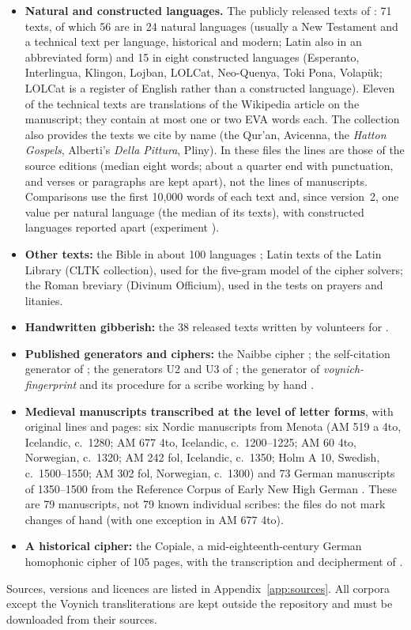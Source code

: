 \begin{itemize}
\item \textbf{Natural and constructed languages.} The publicly released texts of \citet{gaskellbowern2022}: 71 texts,
  of which 56 are in 24 natural languages (usually a New Testament and a technical text per language, historical and
  modern; Latin also in an abbreviated form) and 15 in eight constructed languages (Esperanto, Interlingua, Klingon,
  Lojban, LOLCat, Neo-Quenya, Toki Pona, Volapük; LOLCat is a register of English rather than a constructed language).
  Eleven of the technical texts are translations of the Wikipedia article on the manuscript; they contain at most one
  or two EVA words each. The collection also provides the texts we cite by name (the Qur'an, Avicenna, the \emph{Hatton
  Gospels}, Alberti's \emph{Della Pittura}, Pliny). In these files the lines are those of the source editions (median eight
  words; about a quarter end with punctuation, and verses or paragraphs are kept apart), not the lines of manuscripts. Comparisons use the first 10{,}000 words of each text and, since
  version~2, one value per natural language (the median of its texts), with constructed languages reported apart
  (experiment ).
\item \textbf{Other texts:} the Bible in about 100 languages \citep{christodouloupoulos2015}; Latin texts of the Latin
  Library (CLTK collection), used for the five-gram model of the cipher solvers; the Roman breviary (Divinum Officium),
  used in the tests on prayers and litanies.
\item \textbf{Handwritten gibberish:} the 38 released texts written by volunteers for \citet{gaskellbowern2022}.
\item \textbf{Published generators and ciphers:} the Naibbe cipher \citep{greshko2025}; the self-citation generator of
  \citet{timmschinner2020}; the generators U2 and U3 of \citet{whitehatnetizen2026}; the generator of
  \emph{voynich-fingerprint} and its procedure for a scribe working by hand \citep{sachak2026}.
\item \textbf{Medieval manuscripts transcribed at the level of letter forms}, with original lines and pages: six
  Nordic manuscripts from Menota \citep{menota} (AM 519 a 4to, Icelandic, c.~1280; AM 677 4to, Icelandic, c.~1200--1225;
  AM 60 4to, Norwegian, c.~1320; AM 242 fol, Icelandic, c.~1350; Holm A 10, Swedish, c.~1500--1550; AM 302 fol,
  Norwegian, c.~1300) and 73 German manuscripts of 1350--1500 from the Reference Corpus of Early New High German
  \citep{ref2021}. These are 79 manuscripts, not 79 known individual scribes: the files do not mark changes of hand (with one
exception in AM 677 4to).
\item \textbf{A historical cipher:} the Copiale, a mid-eighteenth-century German homophonic cipher of 105 pages, with
  the transcription and decipherment of \citet{knight2011,knight2012}.
\end{itemize}
Sources, versions and licences are listed in Appendix~\ref{app:sources}. All corpora except the Voynich
transliterations are kept outside the repository and must be downloaded from their sources.

